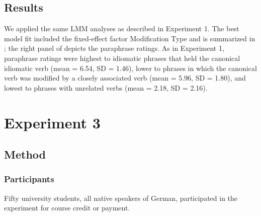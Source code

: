 \documentclass[output=paper]{langsci/langscibook}
\begin{document}
\subsection{Results}
We applied the same LMM analyses as described in Experiment 1. The best model fit included the fixed-effect factor Modification Type and is summarized in ; the right panel of  depicts the paraphrase ratings. As in Experiment 1, paraphrase ratings were highest to idiomatic phrases that held the canonical idiomatic verb (mean = 6.54, SD = 1.46), lower to phrases in which the canonical verb was modified by a closely associated verb (mean = 5.96, SD = 1.80), and lowest to phrases with unrelated verbs (mean = 2.18, SD = 2.16). 

\begin{table}[H]
\caption{Fixed effects of the predictors in the linear mixed-effect model for the paraphrase ratings in Experiment 2. \textit{Notes:} significance code: *** < 0.0001, ** < 0.01.\label{tab:Table5}}
\end{table}

\section{Experiment 3}
\subsection{Method}
\subsubsection{Participants}

Fifty university students, all native speakers of German, participated in the experiment for course credit or payment.
\end{document}
